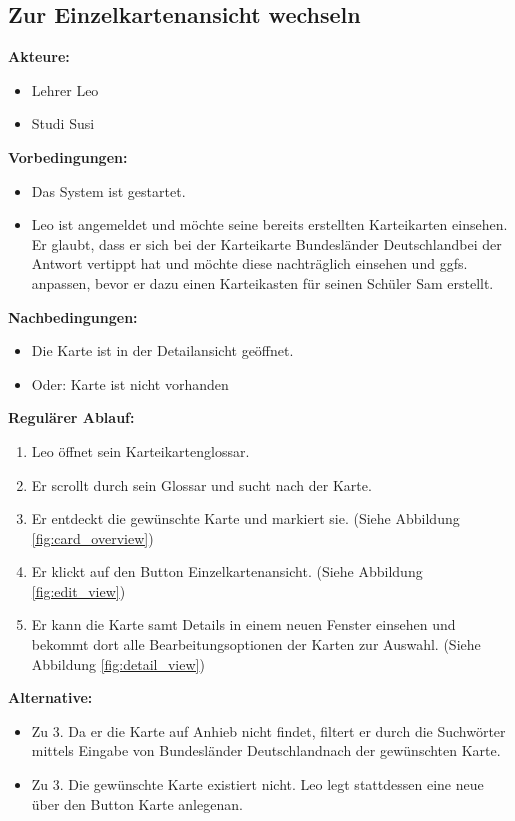 \documentclass[fontsize=12pt,paper=a4,twoside]{scrartcl}
\begin{document}
\subsection{Zur Einzelkartenansicht wechseln}
\textbf{Akteure:}
\begin{itemize}
	\item Lehrer Leo
	\item Studi Susi
\end{itemize}
\textbf{Vorbedingungen:}
\begin{itemize}
	\item Das System ist gestartet.
	\item Leo ist angemeldet und möchte seine bereits erstellten Karteikarten einsehen.
	Er glaubt, dass er sich bei der Karteikarte \dq Bundesländer Deutschland\dq bei der Antwort vertippt hat und möchte diese nachträglich einsehen und ggfs. anpassen, bevor er dazu einen Karteikasten für seinen Schüler Sam erstellt.
\end{itemize}
\textbf{Nachbedingungen:}
\begin{itemize}
	\item Die Karte ist in der Detailansicht geöffnet.
	\item Oder: Karte ist nicht vorhanden
\end{itemize}
\textbf{Regulärer Ablauf:}
\begin{enumerate}
	\item Leo öffnet sein Karteikartenglossar.
	\item Er scrollt durch sein Glossar und sucht nach der Karte.
	\item Er entdeckt die gewünschte Karte und markiert sie. (Siehe Abbildung \ref{fig:card_overview})
	\item Er klickt auf den Button \dq Einzelkartenansicht\dq. (Siehe Abbildung \ref{fig:edit_view})
	\item Er kann die Karte samt Details in einem neuen Fenster einsehen und bekommt dort alle Bearbeitungsoptionen der Karten zur Auswahl. (Siehe Abbildung \ref{fig:detail_view})
\end{enumerate}
\textbf{Alternative:}
\begin{itemize}
	\item Zu 3. Da er die Karte auf Anhieb nicht findet, filtert er durch die Suchwörter mittels Eingabe von \dq Bundesländer Deutschland\dq nach der gewünschten Karte.
	\item Zu 3. Die gewünschte Karte existiert nicht. Leo legt stattdessen eine neue über den Button \dq Karte anlegen\dq an.
\end{itemize}
\end{document}
